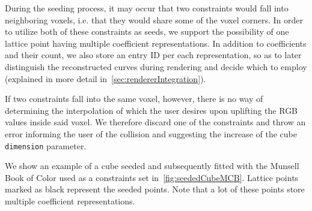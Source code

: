 During the seeding process, it may occur that two constraints would fall into neighboring voxels, i.e. that they would share some of the voxel corners. In order to utilize both of these constraints as seeds, we support the possibility of one lattice point having multiple coefficient representations. In addition to coefficients and their count, we also store an entry ID per each representation, so as to later distinguish the reconstructed curves during rendering and decide which to employ (explained in more detail in~\cref{sec:rendererIntegration}).

If two constraints fall into the same voxel, however, there is no way of determining the interpolation of which the user desires upon uplifting the RGB values inside said voxel. We therefore discard one of the constraints and throw an error informing the user of the collision and suggesting the increase of the cube \texttt{dimension} parameter.

We show an example of a cube seeded and subsequently fitted with the Munsell Book of Color used as a constraints set in~\cref{fig:seededCubeMCB}. Lattice points marked as black represent the seeded points. Note that a lot of these points store multiple coefficient representations.

